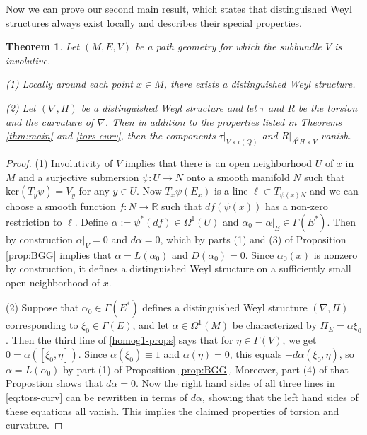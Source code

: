 \documentclass[11pt]{amsart}
\newtheorem{theorem}[proposition]{Theorem}
\numberwithin{proposition}{section}
\numberwithin{equation}{section}
\begin{document}
Now we can prove our second main result, which states that distinguished Weyl structures always exist locally and describes their special properties. 

\begin{theorem}\label{thm:dist}
    Let $(M,E,V)$ be a path geometry for which the subbundle $V$ is involutive. 

    (1) Locally around each point $x\in M$, there exists a distinguished Weyl structure. 

    (2) Let $(\nabla,\Pi)$ be a distinguished Weyl structure and let $\tau$ and $R$ be the torsion and the curvature of $\nabla$. Then in addition to the properties listed in Theorems \ref{thm:main} and \ref{tors-curv}, then the components $\tau|_{V\times\iota(Q)}$ and $R|_{\Lambda^2H\times V}$ vanish.
\end{theorem}
\begin{proof}
    (1) Involutivity of $V$ implies that there is an open neighborhood $U$ of $x$ in $M$ and a surjective submersion $\psi:U\to N$ onto a smooth manifold $N$ such that $\text{ker}(T_y\psi)=V_y$ for any $y\in U$. Now $T_x\psi(E_x)$ is a line $\ell\subset T_{\psi(x)N}$ and we can choose a smooth function $f:N\to\mathbb R$ such that $df(\psi(x))$ has a non-zero restriction to $\ell$. Define $\alpha:=\psi^*(df)\in\Omega^1(U)$ and $\alpha_0=\alpha|_E\in\Gamma(E^*)$. Then by construction $\alpha|_V=0$ and $d\alpha=0$, which by parts (1) and (3) of Proposition \ref{prop:BGG} implies that $\alpha=L(\alpha_0)$ and $D(\alpha_0)=0$. Since $\alpha_0(x)$ is nonzero by construction, it defines a distinguished Weyl structure on a sufficiently small open neighborhood of $x$. 

    (2) Suppose that $\alpha_0\in\Gamma(E^*)$ defines a distinguished Weyl structure $(\nabla,\Pi)$ corresponding to $\xi_0\in\Gamma(E)$, and let $\alpha\in\Omega^1(M)$ be characterized by $\Pi_E=\alpha\xi_0$. Then the third line of \eqref{homog1-props} says that for $\eta\in\Gamma(V)$, we get $0=\alpha([\xi_0,\eta])$. Since $\alpha(\xi_0)\equiv 1$ and $\alpha(\eta)=0$, this equals $-d\alpha(\xi_0,\eta)$, so $\alpha=L(\alpha_0)$ by part (1) of Proposition \ref{prop:BGG}. Moreover, part (4) of that Propostion shows that $d\alpha=0$. Now the right hand sides of all three lines in \eqref{eq:tors-curv} can be rewritten in terms of $d\alpha$, showing that the left hand sides of these equations all vanish. This implies the claimed properties of torsion and curvature. 
\end{proof}
\end{document}
